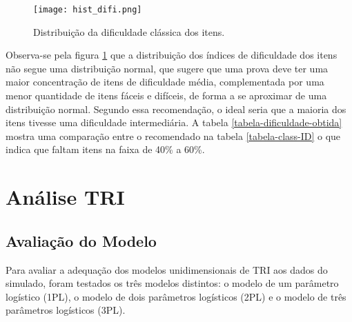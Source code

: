 \begin{figure}[H]
	\centering
	\texttt{[image: hist\_difi.png]}
	\caption{Distribuição da dificuldade clássica dos itens.}
	\label{fig:hist_difi}
\end{figure}


Observa-se pela figura \ref{fig:hist_difi} que a distribuição dos índices de dificuldade dos itens não segue uma distribuição normal, que sugere que uma prova deve ter uma maior concentração de itens de dificuldade média, complementada por uma menor quantidade de itens fáceis e difíceis, de forma a se aproximar de uma distribuição normal. Segundo essa recomendação, o ideal seria que a maioria dos itens tivesse uma dificuldade intermediária. A tabela \ref{tabela-dificuldade-obtida} mostra uma comparação entre o recomendado na tabela \ref{tabela-class-ID} o que indica que faltam itens na faixa de 40\% a 60\%.

\begin{table}[H]
\end{table}


\newpage
\section{Análise TRI}

\subsection{Avaliação do Modelo}

Para avaliar a adequação dos modelos unidimensionais de TRI aos dados do simulado, foram
testados os três modelos distintos: o modelo de um parâmetro logístico (1PL), o modelo de dois parâmetros logísticos (2PL) e o modelo de três parâmetros logísticos (3PL).

